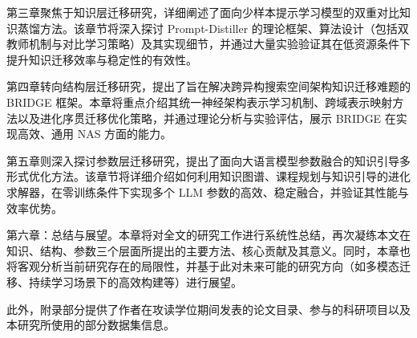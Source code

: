 \documentclass[../main.tex]{subfiles}
\begin{document}
第三章聚焦于知识层迁移研究，详细阐述了面向少样本提示学习模型的双重对比知识蒸馏方法。该章节将深入探讨 Prompt-Distiller 的理论框架、算法设计（包括双教师机制与对比学习策略）及其实现细节，并通过大量实验验证其在低资源条件下提升知识迁移效率与稳定性的有效性。

第四章转向结构层迁移研究，提出了旨在解决跨异构搜索空间架构知识迁移难题的 BRIDGE 框架。本章将重点介绍其统一神经架构表示学习机制、跨域表示映射方法以及进化序贯迁移优化策略，并通过理论分析与实验评估，展示 BRIDGE 在实现高效、通用 NAS 方面的能力。

第五章则深入探讨参数层迁移研究，提出了面向大语言模型参数融合的知识引导多形式优化方法。该章节将详细介绍如何利用知识图谱、课程规划与知识引导的进化求解器，在零训练条件下实现多个 LLM 参数的高效、稳定融合，并验证其性能与效率优势。

第六章：总结与展望。本章将对全文的研究工作进行系统性总结，再次凝练本文在知识、结构、参数三个层面所提出的主要方法、核心贡献及其意义。同时，本章也将客观分析当前研究存在的局限性，并基于此对未来可能的研究方向（如多模态迁移、持续学习场景下的高效构建等）进行展望。

此外，附录部分提供了作者在攻读学位期间发表的论文目录、参与的科研项目以及本研究所使用的部分数据集信息。
\end{document}
